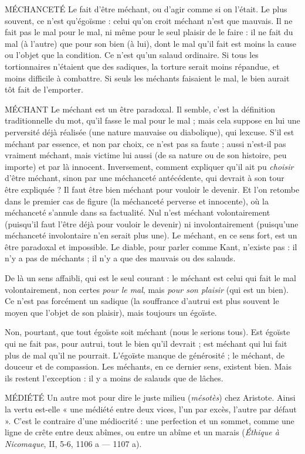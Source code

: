 MÉCHANCETÉ Le fait d’être méchant, ou d’agir comme si on l'était. Le
plus souvent, ce n’est qu’égoïsme : celui qu’on croit méchant
n’est que mauvais. Il ne fait pas le mal pour le mal, ni même pour le seul plaisir
de le faire : il ne fait du mal (à l’autre) que pour son bien (à lui), dont le mal
qu’il fait est moins la cause ou l’objet que la condition. Ce n’est qu’un salaud
ordinaire. Si tous les tortionnaires n'étaient que des sadiques, la torture serait
moins répandue, et moins difficile à combattre. Si seuls les méchants faisaient
le mal, le bien aurait tôt fait de l'emporter.

MÉCHANT Le méchant est un être paradoxal. Il semble, c’est la définition
traditionnelle du mot, qu’il fasse le mal pour le mal ; mais cela
suppose en lui une perversité déjà réalisée (une nature mauvaise ou diabolique),
qui lexcuse. S'il est méchant par essence, et non par choix, ce n’est pas sa
faute ; aussi n'est-il pas vraiment méchant, mais victime lui aussi (de sa nature
ou de son histoire, peu importe) et par là innocent. Inversement, comment
expliquer qu’il ait pu {\it choisir} d’être méchant, sinon par une méchanceté antécédente,
qui devrait à son tour être expliquée ? Il faut être bien méchant pour
vouloir le devenir. Et l’on retombe dans le premier cas de figure (la méchanceté
perverse et innocente), où la méchanceté s’annule dans sa factualité. Nul n’est
méchant volontairement (puisqu'il faut l’être déjà pour vouloir le devenir) ni
involontairement (puisqu’une méchanceté involontaire n’en serait plus une).
Le méchant, en ce sens fort, est un être paradoxal et impossible. Le diable, pour
parler comme Kant, n'existe pas : il n’y a pas de méchants ; il n’y a que des
mauvais ou des salauds.

De là un sens affaibli, qui est le seul courant : le méchant est celui qui fait
le mal volontairement, non certes {\it pour le mal}, mais {\it pour son plaisir} (qui est un
bien). Ce n’est pas forcément un sadique (la souffrance d’autrui est plus souvent
le moyen que l’objet de son plaisir), mais toujours un égoïste.

Non, pourtant, que tout égoïste soit méchant (nous le serions tous). Est
égoïste qui ne fait pas, pour autrui, tout le bien qu’il devrait ; est méchant qui
lui fait plus de mal qu’il ne pourrait. L’égoïste manque de générosité ; le
méchant, de douceur et de compassion. Les méchants, en ce dernier sens, existent
bien. Mais ils restent l’exception : il y a moins de salauds que de lâches.

MÉDIÉTÉ Un autre mot pour dire le juste milieu ({\it mésotès}) chez Aristote.
Ainsi la vertu est-elle « une médiété entre deux vices, l’un par
excès, l’autre par défaut ». C’est le contraire d’une médiocrité : une perfection
et un sommet, comme une ligne de crête entre deux abîmes, ou entre un abîme
et un marais ({\it Éthique à Nicomaque}, II, 5-6, 1106 a — 1107 a).

